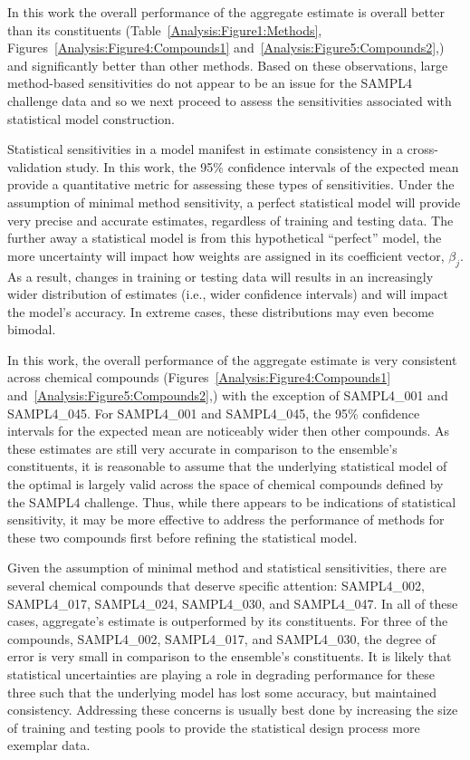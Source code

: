 \documentclass[journal=jpcbfk, manuscript=article]{achemso}
\newcommand{\+}[1]{\ensuremath{\mathbf{#1}}}
\begin{document}
In this work the overall performance of the aggregate estimate is overall better than its constituents (Table~\ref{Analysis:Figure1:Methods}, Figures~\ref{Analysis:Figure4:Compounds1} and~\ref{Analysis:Figure5:Compounds2},) and significantly better than other methods.
Based on these observations, large method-based sensitivities do not appear to be an issue for the SAMPL4 challenge data and so we next proceed to assess
the sensitivities associated with statistical model construction. 

Statistical sensitivities in a model manifest in estimate consistency in a cross-validation study.
In this work, the 95\% confidence intervals of the expected mean provide a quantitative metric for assessing these types of sensitivities. 
Under the assumption of minimal method sensitivity, a perfect statistical model will provide very precise and accurate estimates, regardless of training and testing data.
The further away a statistical model is from this hypothetical ``perfect'' model, the more uncertainty will impact how weights are assigned in its coefficient vector, $\beta_j$.
As a result, changes in training or testing data will results in an increasingly wider distribution of estimates (i.e., wider confidence intervals) and will impact the model's accuracy.
In extreme cases, these distributions may even become bimodal.

In this work, the overall performance of the aggregate estimate is very consistent across chemical compounds (Figures~\ref{Analysis:Figure4:Compounds1} and~\ref{Analysis:Figure5:Compounds2},) with the exception of SAMPL4\_001 and SAMPL4\_045.
For SAMPL4\_001 and SAMPL4\_045, the 95\% confidence intervals for the expected mean are noticeably wider then other compounds.
As these estimates are still very accurate in comparison to the ensemble's constituents, it is reasonable to assume that the underlying statistical model of the optimal is largely valid across the space of chemical compounds defined by the SAMPL4 challenge.
Thus, while there appears to be indications of statistical sensitivity, it may be more effective to address the performance of methods for these two compounds first before refining the statistical model.

Given the assumption of minimal method and statistical sensitivities, there are several chemical compounds that deserve specific attention: SAMPL4\_002, SAMPL4\_017, SAMPL4\_024, SAMPL4\_030, and SAMPL4\_047.
In all of these cases, aggregate's estimate is outperformed by its constituents.
For three of the compounds,  SAMPL4\_002, SAMPL4\_017, and SAMPL4\_030, the degree of error is very small in comparison to the ensemble's constituents. 
It is likely that statistical uncertainties are playing a role in degrading performance for these three such that the underlying model has lost some accuracy, but maintained consistency.
Addressing these concerns is usually best done by increasing the size of training and testing pools to provide the statistical design process more exemplar data.
\end{document}
